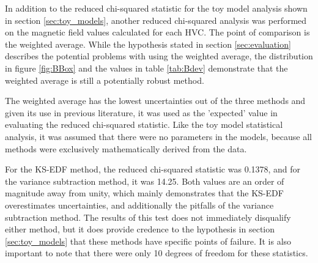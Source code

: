 In addition to the reduced chi-squared statistic for the toy model analysis shown in section \ref{sec:toy_models}, another reduced chi-squared analysis was performed on the magnetic field values calculated for each HVC. The point of comparison is the weighted average. While the hypothesis stated in section \ref{sec:evaluation} describes the potential problems with using the weighted average, the distribution in figure \ref{fig:BBox} and the values in table \ref{tab:Bdev} demonstrate that the weighted average is still a potentially robust method.


The weighted average has the lowest uncertainties out of the three methods and given its use in previous literature, it was used as the 'expected' value in evaluating the reduced chi-squared statistic. Like the toy model statistical analysis, it was assumed that there were no parameters in the models, because all methods were exclusively mathematically derived from the data.


For the KS-EDF method, the reduced chi-squared statistic was 0.1378, and for the variance subtraction method, it was 14.25. Both values are an order of magnitude away from unity, which mainly demonstrates that the KS-EDF overestimates uncertainties, and additionally the pitfalls of the variance subtraction method. The results of this test does not immediately disqualify either method, but it does provide credence to the hypothesis in section \ref{sec:toy_models} that these methods have specific points of failure. It is also important to note that there were only 10 degrees of freedom for these statistics.




